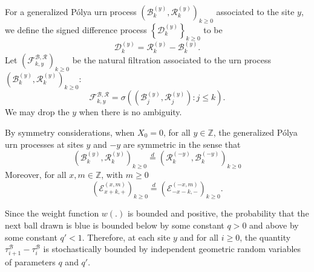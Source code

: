 \documentclass[EJP]{ejpecp} %
\begin{document}
For a generalized P\'{o}lya urn process $\left(\mathscr{B}^{(y)}_k,\mathscr{R}^{(y)}_k \right)_{k\geq 0}$ associated to the site $y$, we define the signed difference process $\left\{\mathscr{D}^{(y)}_{k}\right\}_{k \ge 0} $ to be
\begin{equation}\label{eq:signed difference}
	\mathscr{D}^{(y)}_k  =\mathscr{R}^{(y)}_k -\mathscr{B}^{(y)}_k.  
\end{equation}
Let $\left(\mathcal{F}^{\mathscr{B},\mathscr{R}}_{k, y}\right)_{k \ge 0}$ be the natural filtration associated to the urn process $\left(\mathscr{B}^{(y)}_k,\mathscr{R}^{(y)}_k \right)_{k\geq 0}$:  
\[
\mathcal{F}^{\mathscr{B},\mathscr{R}}_{k, y} = \sigma\left( \left(\mathscr{B}_j^{(y)},\mathscr{R}_j^{(y)} \right): j\leq k \right).
\]  
We may drop the $y$ when there is no ambiguity.
\begin{remark}
	\label{rm:symmetry}
	By symmetry considerations, when $X_0 = 0$, for all $y \in \mathbb{Z}$, the generalized P\'{o}lya urn processes at sites $y$ and $-y$ are symmetric in the sense that
	\[\left(\mathscr{B}^{(y)}_{k},\mathscr{R}^{(y)}_{k} \right)_{k\ge 0}
	\overset{d}{=} 
	\left(\mathscr{R}^{(-y)}_{k},\mathscr{B}^{(-y)}_{k} \right)_{k\ge 0} \]
	Moreover, for all $x, m \in \mathbb{Z}$, with $m\geq 0$
	\[
	\left(\mathcal{E}^{(x,m)}_{x+k,+} \right)_{k\geq 0} \overset{d}{=} \left(\mathcal{E}^{(-x,m)}_{-x-k,-} \right)_{k\geq 0}.
	\]
\end{remark}
\begin{remark}
	\label{rk:UrnGeo}
	Since the weight function $w(.)$ is bounded and positive, the probability that the next ball drawn is blue is bounded below by some constant $q > 0$ and above by some constant $q' < 1$. Therefore, at each site $y$ and for all $i \ge 0$, the quantity $\tau_{i+1}^{\mathscr{B}} - \tau_{i}^{\mathscr{B}}$ is stochastically bounded by independent geometric random variables of parameters $q$ and $q'$. 
\end{remark}
\end{document}

